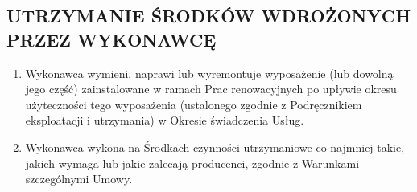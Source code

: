 \begin{multicols}{2}
\subsection{UTRZYMANIE ŚRODKÓW WDROŻONYCH PRZEZ WYKONAWCĘ}
\begin{enumerate}
	\item Wykonawca wymieni, naprawi lub wyremontuje wyposażenie (lub dowolną jego część) zainstalowane w ramach Prac renowacyjnych po upływie okresu użyteczności tego wyposażenia (ustalonego zgodnie z Podręcznikiem eksploatacji i utrzymania) w Okresie świadczenia Usług.
	\item Wykonawca wykona na Środkach czynności utrzymaniowe co najmniej takie, jakich wymaga lub jakie zalecają producenci, zgodnie z Warunkami szczególnymi Umowy.
\end{enumerate}


\end{multicols}

